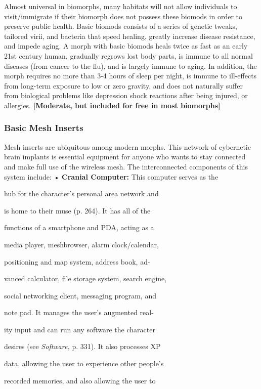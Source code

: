 Almost universal in biomorphs, many habitats will not 
allow individuals to visit/immigrate if their biomorph 
does not possess these biomods in order to preserve 
public health. Basic biomods consists of a series of 
genetic tweaks, tailored virii, and bacteria that speed 
healing, greatly increase disease resistance, and impede 
aging. A morph with basic biomods heals twice as fast 
as an early 21st century human, gradually regrows lost 
body parts, is immune to all normal diseases (from 
cancer to the flu), and is largely immune to aging. In 
addition, the morph requires no more than 3-4 hours 
of sleep per night, is immune to ill-effects from long-term
exposure to low or zero gravity, and does not
naturally suffer from biological problems like depression
shock reactions after being injured, or allergies.
\textbf{[Moderate, but included for free in most biomorphs]}

\subsubsection{Basic Mesh Inserts}

Mesh inserts are ubiquitous among modern morphs. 
This network of cybernetic brain implants is essential 
equipment for anyone who wants to stay connected 
and make full use of the wireless mesh. The interconnected
components of this system include:
•  \textbf{Cranial Computer:} This computer serves as the 

hub for the character's personal area network and 

is home to their muse (p. 264). It has all of the 

functions of a smartphone and PDA, acting as a 

media player, meshbrowser, alarm clock/calendar, 

positioning and map system, address book, ad-

vanced calculator, file storage system, search engine, 

social networking client, messaging program, and 

note pad. It manages the user's augmented real-

ity input and can run any software the character 

desires (see \textit{Software,} p. 331). It also processes XP 

data, allowing the user to experience other people's 

recorded memories, and also allowing the user to 

